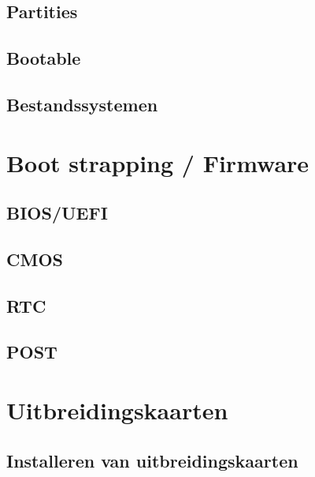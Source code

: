 \documentclass[a4paper,12pt,twoside,openright,titlepage]{book}
\begin{document}
\section{Partities}
\section{Bootable}
\section{Bestandssystemen}

\chapter{Boot strapping / Firmware}
\section{BIOS/UEFI}
\section{CMOS}
\section{RTC}
\section{POST}

\chapter{Uitbreidingskaarten}
\section{Installeren van uitbreidingskaarten}

\backmatter
\printindex
\end{document}
